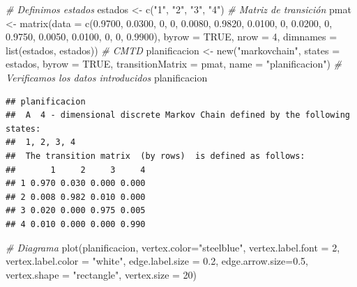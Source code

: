 \documentclass[
]{book}
\newenvironment{Shaded}{\begin{snugshade}}{\end{snugshade}}
\newcommand{\AttributeTok}[1]{\textcolor[rgb]{0.77,0.63,0.00}{#1}}
\newcommand{\CommentTok}[1]{\textcolor[rgb]{0.56,0.35,0.01}{\textit{#1}}}
\newcommand{\ConstantTok}[1]{\textcolor[rgb]{0.00,0.00,0.00}{#1}}
\newcommand{\DecValTok}[1]{\textcolor[rgb]{0.00,0.00,0.81}{#1}}
\newcommand{\FloatTok}[1]{\textcolor[rgb]{0.00,0.00,0.81}{#1}}
\newcommand{\FunctionTok}[1]{\textcolor[rgb]{0.00,0.00,0.00}{#1}}
\newcommand{\NormalTok}[1]{#1}
\newcommand{\OtherTok}[1]{\textcolor[rgb]{0.56,0.35,0.01}{#1}}
\newcommand{\StringTok}[1]{\textcolor[rgb]{0.31,0.60,0.02}{#1}}
\theoremstyle{definition}
\theoremstyle{definition}
\theoremstyle{definition}
\theoremstyle{definition}
\theoremstyle{remark}
\begin{document}
\begin{Shaded}
\begin{Highlighting}[]
\CommentTok{\# Definimos estados}
\NormalTok{estados }\OtherTok{\textless{}{-}} \FunctionTok{c}\NormalTok{(}\StringTok{"1"}\NormalTok{, }\StringTok{"2"}\NormalTok{, }\StringTok{"3"}\NormalTok{, }\StringTok{"4"}\NormalTok{)}
\CommentTok{\# Matriz de transición }
\NormalTok{pmat }\OtherTok{\textless{}{-}} \FunctionTok{matrix}\NormalTok{(}\AttributeTok{data =} \FunctionTok{c}\NormalTok{(}\FloatTok{0.9700}\NormalTok{, }\FloatTok{0.0300}\NormalTok{, }\DecValTok{0}\NormalTok{, }\DecValTok{0}\NormalTok{, }
                        \FloatTok{0.0080}\NormalTok{, }\FloatTok{0.9820}\NormalTok{, }\FloatTok{0.0100}\NormalTok{, }\DecValTok{0}\NormalTok{,   }
                        \FloatTok{0.0200}\NormalTok{, }\DecValTok{0}\NormalTok{, }\FloatTok{0.9750}\NormalTok{, }\FloatTok{0.0050}\NormalTok{,}
                        \FloatTok{0.0100}\NormalTok{, }\DecValTok{0}\NormalTok{, }\DecValTok{0}\NormalTok{, }\FloatTok{0.9900}\NormalTok{), }
               \AttributeTok{byrow =} \ConstantTok{TRUE}\NormalTok{, }\AttributeTok{nrow =} \DecValTok{4}\NormalTok{, }
               \AttributeTok{dimnames =} \FunctionTok{list}\NormalTok{(estados, estados))}
\CommentTok{\# CMTD}
\NormalTok{planificacion }\OtherTok{\textless{}{-}} \FunctionTok{new}\NormalTok{(}\StringTok{"markovchain"}\NormalTok{, }\AttributeTok{states =}\NormalTok{ estados, }
                 \AttributeTok{byrow =} \ConstantTok{TRUE}\NormalTok{, }\AttributeTok{transitionMatrix =}\NormalTok{ pmat, }
                 \AttributeTok{name =} \StringTok{"planificacion"}\NormalTok{)}
\CommentTok{\# Verificamos los datos introducidos}
\NormalTok{planificacion}
\end{Highlighting}
\end{Shaded}

\begin{verbatim}
## planificacion 
##  A  4 - dimensional discrete Markov Chain defined by the following states: 
##  1, 2, 3, 4 
##  The transition matrix  (by rows)  is defined as follows: 
##       1     2     3     4
## 1 0.970 0.030 0.000 0.000
## 2 0.008 0.982 0.010 0.000
## 3 0.020 0.000 0.975 0.005
## 4 0.010 0.000 0.000 0.990
\end{verbatim}

\begin{Shaded}
\begin{Highlighting}[]
\CommentTok{\# Diagrama}
\FunctionTok{plot}\NormalTok{(planificacion, }\AttributeTok{vertex.color=}\StringTok{"steelblue"}\NormalTok{, }
     \AttributeTok{vertex.label.font =} \DecValTok{2}\NormalTok{, }
     \AttributeTok{vertex.label.color =} \StringTok{"white"}\NormalTok{,}
     \AttributeTok{edge.label.size =} \FloatTok{0.2}\NormalTok{,}
     \AttributeTok{edge.arrow.size=}\FloatTok{0.5}\NormalTok{, }
     \AttributeTok{vertex.shape =} \StringTok{"rectangle"}\NormalTok{,}
     \AttributeTok{vertex.size =} \DecValTok{20}\NormalTok{)}
\end{Highlighting}
\end{Shaded}
\end{document}
